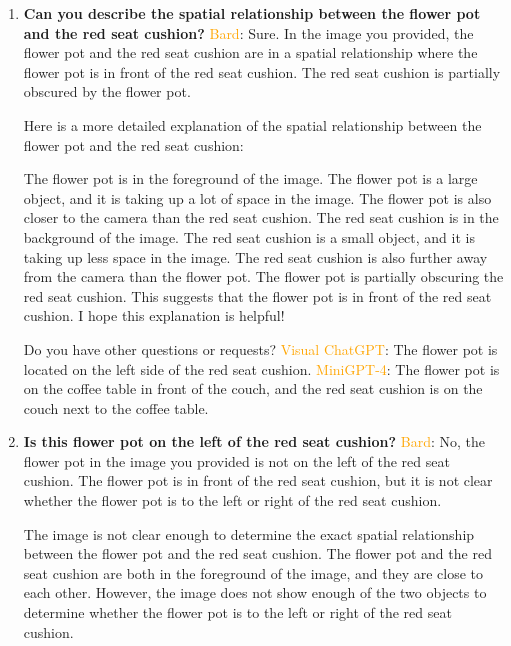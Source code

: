 \begin{enumerate}
    \item \textbf{Can you describe the spatial relationship between the flower pot and the red seat cushion?}
    \subitem \textcolor{orange}{Bard}: 
    Sure. In the image you provided, the flower pot and the red seat cushion are in a spatial relationship where the flower pot is in front of the red seat cushion. The red seat cushion is partially obscured by the flower pot.
    
    Here is a more detailed explanation of the spatial relationship between the flower pot and the red seat cushion:
    
    The flower pot is in the foreground of the image. The flower pot is a large object, and it is taking up a lot of space in the image. The flower pot is also closer to the camera than the red seat cushion.
    The red seat cushion is in the background of the image. The red seat cushion is a small object, and it is taking up less space in the image. The red seat cushion is also further away from the camera than the flower pot.
    The flower pot is partially obscuring the red seat cushion. This suggests that the flower pot is in front of the red seat cushion.
    I hope this explanation is helpful!
    
    Do you have other questions or requests?
    \subitem \textcolor{orange}{Visual ChatGPT}: The flower pot is located on the left side of the red seat cushion.
    \subitem \textcolor{orange}{MiniGPT-4}: The flower pot is on the coffee table in front of the couch, and the red seat cushion is on the couch next to the coffee table.
    \item \textbf{Is this flower pot on the left of the red seat cushion?}
    \subitem \textcolor{orange}{Bard}: 
    No, the flower pot in the image you provided is not on the left of the red seat cushion. The flower pot is in front of the red seat cushion, but it is not clear whether the flower pot is to the left or right of the red seat cushion.
    
    The image is not clear enough to determine the exact spatial relationship between the flower pot and the red seat cushion. The flower pot and the red seat cushion are both in the foreground of the image, and they are close to each other. However, the image does not show enough of the two objects to determine whether the flower pot is to the left or right of the red seat cushion.
    

\end{enumerate}
